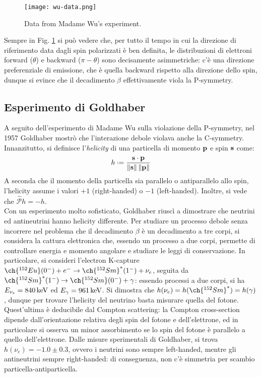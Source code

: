 \begin{figure}
	\centering
	\texttt{[image: wu-data.png]}
	\caption{Data from Madame Wu's experiment.}
	\label{wu-data}
\end{figure}

Sempre in Fig. \ref{wu-data} si può vedere che, per tutto il tempo in cui la direzione di riferimento data dagli spin polarizzati è ben definita, le distribuzioni di elettroni forward ($ \theta $) e backward ($ \pi - \theta $) sono decisamente asimmetriche: c'è una direzione preferenziale di emissione, che è quella backward rispetto alla direzione dello spin, dunque si evince che il decadimento $ \beta $ effettivamente viola la P-symmetry.

\subsection{Esperimento di Goldhaber}

A seguito dell'esperimento di Madame Wu sulla violazione della P-symmetry, nel 1957 Goldhaber mostrò che l'interazione debole violava anche la C-symmetry.\\
Innanzitutto, si definisce l'\textit{helicity} di una particella di momento $ \mathbf{p} $ e spin $ \mathbf{s} $ come:
\begin{equation}
	h \defeq \frac{\ve{s} \cdot \ve{p}}{\norm{\ve{s}} \norm{\ve{p}}}
	\label{eq:10.1}
\end{equation}
A seconda che il momento della particella sia parallelo o antiparallelo allo spin, l'helicity assume i valori $ +1 $ (right-handed) o $ -1 $ (left-handed). Inoltre, si vede che $ \hat{\mathcal{P}}h = -h $.\\
Con un esperimento molto sofisticato, Goldhaber riuscì a dimostrare che neutrini ed antineutrini hanno helicity differente. Per studiare un processo debole senza incorrere nel problema che il decadimento $ \beta $ è un decadimento a tre corpi, si considera la cattura elettronica che, essendo un processo a due corpi, permette di controllare energia e momento angolare e studiare le leggi di conservazione. In particolare, si consideri l'electron K-capture $ \ch{^{152}Eu}(0^-) + e^- \rightarrow \ch{^{152}Sm}^*(1^-) + \nu_e $, seguita da $ \ch{^{152}Sm}^*(1^-) \rightarrow \ch{^{152}Sm}(0^-) + \gamma $: essendo processi a due corpi, si ha $ E_{\nu_e} = 840\,\mathrm{keV} $ ed $ E_{\gamma} = 961\,\mathrm{keV} $. Si dimostra che $ h(\nu_e) = h(\ch{^{152}Sm}^*) = h(\gamma) $, dunque per trovare l'helicity del neutrino basta misurare quella del fotone. Quest'ultima è deducibile dal Compton scattering: la Compton cross-section dipende dall'orientazione relativa degli spin del fotone e dell'elettrone, ed in particolare si osserva un minor assorbimento se lo spin del fotone è parallelo a quello dell'elettrone. Dalle misure sperimentali di Goldhaber, si trova $ h(\nu_e) = -1.0 \pm 0.3 $, ovvero i neutrini sono sempre left-handed, mentre gli antineutrini sempre right-handed: di conseguenza, non c'è simmetria per scambio particella-antiparticella.

